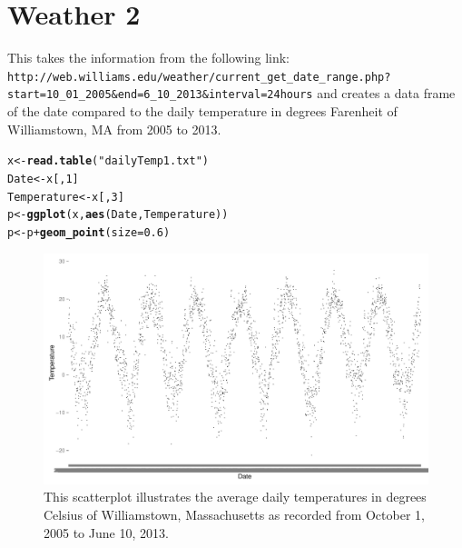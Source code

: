 \documentclass{article}\usepackage{graphicx, color}
\makeatletter
\def\maxwidth{ %
  \ifdim\Gin@nat@width>\linewidth
    \linewidth
  \else
    \Gin@nat@width
  \fi
}
\newcommand{\hlfunctioncall}[1]{\textcolor[rgb]{0.501960784313725,0,0.329411764705882}{\textbf{#1}}}%
\newcommand{\hlstring}[1]{\textcolor[rgb]{0.6,0.6,1}{#1}}%
\newenvironment{kframe}{%
 \def\at@end@of@kframe{}%
 \ifinner\ifhmode%
  \def\at@end@of@kframe{\end{minipage}}%
  \begin{minipage}{\columnwidth}%
 \fi\fi%
 \def\FrameCommand##1{\hskip\@totalleftmargin \hskip-\fboxsep
 \colorbox{shadecolor}{##1}\hskip-\fboxsep
     \hskip-\linewidth \hskip-\@totalleftmargin \hskip\columnwidth}%
 \MakeFramed {\advance\hsize-\width
   \@totalleftmargin\z@ \linewidth\hsize
   \@setminipage}}%
 {\par\unskip\endMakeFramed%
 \at@end@of@kframe}
\newenvironment{knitrout}{}{} %
\makeatother
\begin{document}
\section*{Weather 2}
This takes the information from the following link:
\verb+http://web.williams.edu/weather/current_get_date_range.php?start=10_01_2005&end=6_10_2013&interval=24hours+
and creates a data frame of the date compared to the daily temperature
in degrees Farenheit of Williamstown, MA from 2005 to 2013.

\begin{knitrout}
\color{fgcolor}\begin{kframe}
\begin{alltt}
x <- \hlfunctioncall{read.table}(\hlstring{"dailyTemp1.txt"})
Date <- x[, 1]
Temperature <- x[, 3]
p <- \hlfunctioncall{ggplot}(x, \hlfunctioncall{aes}(Date, Temperature))
p <- p + \hlfunctioncall{geom_point}(size = 0.6)
\end{alltt}
\end{kframe}
\end{knitrout}


\begin{landscape}
  \begin{figure}
\begin{knitrout}
\color{fgcolor}
\includegraphics[width=\maxwidth]{figure/graph2Landscape} 

\end{knitrout}


\caption{This scatterplot illustrates the average daily temperatures in degrees Celsius of Williamstown, Massachusetts as recorded from October 1, 2005 to June 10,  2013.}
\end{figure}
\end{landscape}
\end{document}
